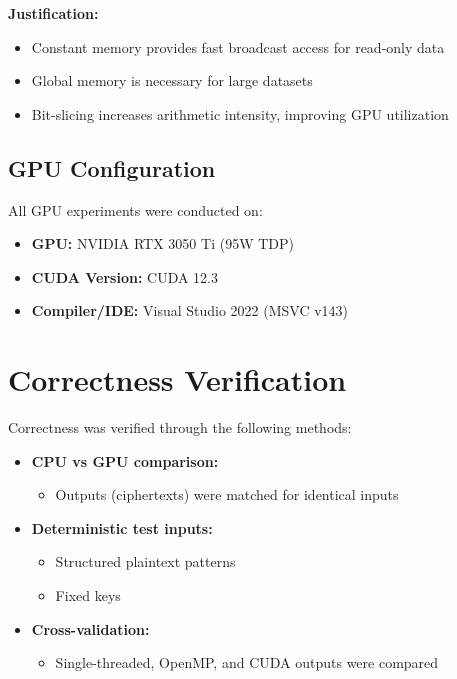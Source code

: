 \textbf{Justification:}
\begin{itemize}
    \item Constant memory provides fast broadcast access for read-only data
    \item Global memory is necessary for large datasets
    \item Bit-slicing increases arithmetic intensity, improving GPU utilization
\end{itemize}

\subsection{GPU Configuration}

All GPU experiments were conducted on:

\begin{itemize}
    \item \textbf{GPU:} NVIDIA RTX 3050 Ti (95W TDP)
    \item \textbf{CUDA Version:} CUDA 12.3
    \item \textbf{Compiler/IDE:} Visual Studio 2022 (MSVC v143)
\end{itemize}

\section{Correctness Verification}

Correctness was verified through the following methods:

\begin{itemize}
    \item \textbf{CPU vs GPU comparison:}
    \begin{itemize}
        \item Outputs (ciphertexts) were matched for identical inputs
    \end{itemize}

    \item \textbf{Deterministic test inputs:}
    \begin{itemize}
        \item Structured plaintext patterns
        \item Fixed keys
    \end{itemize}

    \item \textbf{Cross-validation:}
    \begin{itemize}
        \item Single-threaded, OpenMP, and CUDA outputs were compared
    \end{itemize}
\end{itemize}

